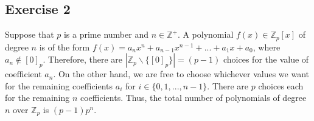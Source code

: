 \subsection*{Exercise 2}
Suppose that $p$ is a prime number and $n \in \mathbb{Z}^+$. A polynomial $f(x) \in \mathbb{Z}_p[x]$ of degree $n$ is of the form $f(x) = a_nx^n + a_{n-1}x^{n-1} + ... + a_1x + a_0$, where $a_n \notin [0]_p$. Therefore, there are $|\mathbb{Z}_p \backslash \{[0]_p\}| = (p-1)$ choices for the value of coefficient $a_n$. On the other hand, we are free to choose whichever values we want for the remaining coefficients $a_i$ for $i \in \{0,1,...,n-1\}$. There are $p$ choices each for the remaining $n$ coefficients. Thus, the total number of polynomials of degree $n$ over $\mathbb{Z}_p$ is $(p-1)p^n$.